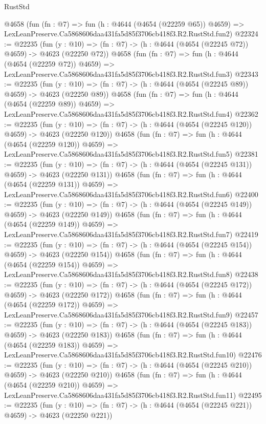 \begin{lexlean}{RustStd}
\begin{coremodule}
    @4658
    (fun (fn : @7) =>
    fun (h : @4644 (@4654 (@22259 @65)) @4659) =>
    LexLeanPreserve.Ca5868606daa431fa5d85f3706cb418f3.R2.RustStd.fun2)
@22324 := @22235
    (fun (y : @10) => (fn : @7) -> (h : @4644 (@4654 (@22245 @72)) @4659) -> @4623 (@22250 @72))
    @4658
    (fun (fn : @7) =>
    fun (h : @4644 (@4654 (@22259 @72)) @4659) =>
    LexLeanPreserve.Ca5868606daa431fa5d85f3706cb418f3.R2.RustStd.fun3)
@22343 := @22235
    (fun (y : @10) => (fn : @7) -> (h : @4644 (@4654 (@22245 @89)) @4659) -> @4623 (@22250 @89))
    @4658
    (fun (fn : @7) =>
    fun (h : @4644 (@4654 (@22259 @89)) @4659) =>
    LexLeanPreserve.Ca5868606daa431fa5d85f3706cb418f3.R2.RustStd.fun4)
@22362 := @22235
    (fun (y : @10) => (fn : @7) -> (h : @4644 (@4654 (@22245 @120)) @4659) -> @4623 (@22250 @120))
    @4658
    (fun (fn : @7) =>
    fun (h : @4644 (@4654 (@22259 @120)) @4659) =>
    LexLeanPreserve.Ca5868606daa431fa5d85f3706cb418f3.R2.RustStd.fun5)
@22381 := @22235
    (fun (y : @10) => (fn : @7) -> (h : @4644 (@4654 (@22245 @131)) @4659) -> @4623 (@22250 @131))
    @4658
    (fun (fn : @7) =>
    fun (h : @4644 (@4654 (@22259 @131)) @4659) =>
    LexLeanPreserve.Ca5868606daa431fa5d85f3706cb418f3.R2.RustStd.fun6)
@22400 := @22235
    (fun (y : @10) => (fn : @7) -> (h : @4644 (@4654 (@22245 @149)) @4659) -> @4623 (@22250 @149))
    @4658
    (fun (fn : @7) =>
    fun (h : @4644 (@4654 (@22259 @149)) @4659) =>
    LexLeanPreserve.Ca5868606daa431fa5d85f3706cb418f3.R2.RustStd.fun7)
@22419 := @22235
    (fun (y : @10) => (fn : @7) -> (h : @4644 (@4654 (@22245 @154)) @4659) -> @4623 (@22250 @154))
    @4658
    (fun (fn : @7) =>
    fun (h : @4644 (@4654 (@22259 @154)) @4659) =>
    LexLeanPreserve.Ca5868606daa431fa5d85f3706cb418f3.R2.RustStd.fun8)
@22438 := @22235
    (fun (y : @10) => (fn : @7) -> (h : @4644 (@4654 (@22245 @172)) @4659) -> @4623 (@22250 @172))
    @4658
    (fun (fn : @7) =>
    fun (h : @4644 (@4654 (@22259 @172)) @4659) =>
    LexLeanPreserve.Ca5868606daa431fa5d85f3706cb418f3.R2.RustStd.fun9)
@22457 := @22235
    (fun (y : @10) => (fn : @7) -> (h : @4644 (@4654 (@22245 @183)) @4659) -> @4623 (@22250 @183))
    @4658
    (fun (fn : @7) =>
    fun (h : @4644 (@4654 (@22259 @183)) @4659) =>
    LexLeanPreserve.Ca5868606daa431fa5d85f3706cb418f3.R2.RustStd.fun10)
@22476 := @22235
    (fun (y : @10) => (fn : @7) -> (h : @4644 (@4654 (@22245 @210)) @4659) -> @4623 (@22250 @210))
    @4658
    (fun (fn : @7) =>
    fun (h : @4644 (@4654 (@22259 @210)) @4659) =>
    LexLeanPreserve.Ca5868606daa431fa5d85f3706cb418f3.R2.RustStd.fun11)
@22495 := @22235
    (fun (y : @10) => (fn : @7) -> (h : @4644 (@4654 (@22245 @221)) @4659) -> @4623 (@22250 @221))

\end{coremodule}
\end{lexlean}
